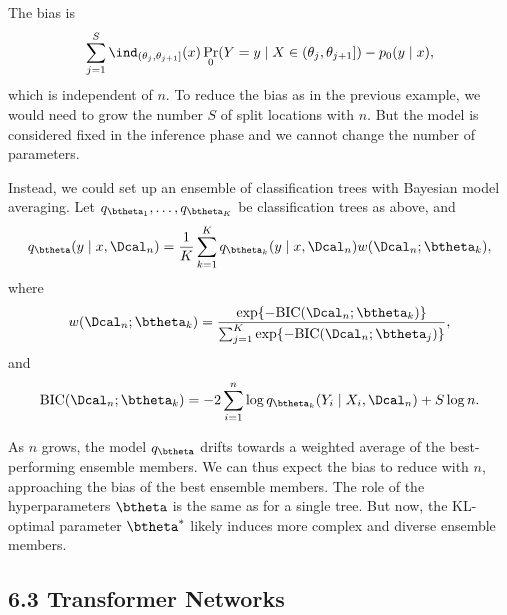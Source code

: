 \documentclass[aspectratio=169,10pt]{beamer}
\newcommand{\currentheading}{\ifx\insertsubsection\empty\insertsection\else\insertsubsection\fi}
\begin{document}
\begin{frame}{\currentheading}
The bias is
\begin{align*}
     \sum_{j = 1}^{S}  \ind_{(\theta_j, \theta_{j + 1}]}(x)  \Pr_0(Y = y \mid X \in ( \theta_{j},  \theta_{j + 1}]) - p_0(y \mid x),
\end{align*}
which is independent of $n$. To reduce the bias as in the previous example, we would need to grow the number $S$ of split locations with $n$. But the model is considered fixed in the inference phase and we cannot change the number of parameters.
\end{frame}

\begin{frame}{\currentheading}
Instead, we could set up an ensemble of classification trees with Bayesian model averaging. Let $q_{\btheta_1}, \dots, q_{\btheta_K}$ be classification trees as above, and
\begin{align*}
	q_{\btheta}(y \mid x, \Dcal_n) = \frac{1}{K} \sum_{k = 1}^K q_{\btheta_k}(y \mid x, \Dcal_n) w(\Dcal_n; \btheta_k),
\end{align*}
where
\begin{align*}
	w(\Dcal_n; \btheta_k) = \frac{\exp\{-\mathrm{BIC}(\Dcal_n; \btheta_k)\} }{\sum_{j = 1}^K \exp\{ -\mathrm{BIC}(\Dcal_n; \btheta_j)\}},
\end{align*}
and
\begin{align*}
	\mathrm{BIC}(\Dcal_n; \btheta_k) = -2\sum_{i = 1}^n \log q_{\btheta_k}(Y_i \mid X_i, \Dcal_n) + S  \log n.
\end{align*}
\end{frame}

\begin{frame}{\currentheading}
As $n$ grows, the model $q_{\btheta}$ drifts towards a weighted average of the best-performing ensemble members. We can thus expect the bias to reduce with $n$, approaching the bias of the best ensemble members. The role of the hyperparameters $\btheta$ is the same as for a single tree. But now, the KL-optimal parameter $\btheta^*$ likely induces more complex and diverse ensemble members.
\end{frame}

\subsection{6.3 Transformer Networks}
\end{document}
